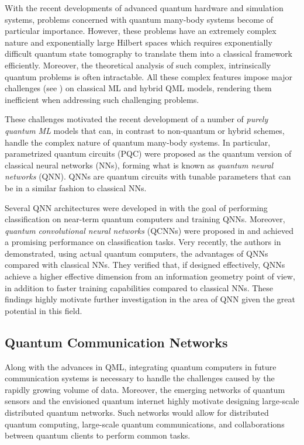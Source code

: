 \documentclass{article}
\begin{document}
With the recent developments of advanced quantum hardware and simulation systems, problems concerned with quantum many-body systems \cite{quantum_many_body_systems} become of particular importance. However, these problems have an extremely complex nature and exponentially large Hilbert spaces which requires exponentially difficult quantum state tomography to translate them into a classical framework efficiently. Moreover, the theoretical analysis of such complex, intrinsically quantum problems is often intractable. All these complex features impose major challenges (see \cite{Cong2019_QCNN}) on classical ML and hybrid QML models, rendering them inefficient when addressing such challenging problems.


These challenges motivated the recent development of a number of \emph{purely quantum ML} models that can, in contrast to non-quantum or hybrid schemes, handle the complex nature of quantum many-body systems. In particular, parametrized quantum circuits (PQC) \cite{PQC_as_ML_models} were proposed as the quantum version of classical neural networks (NNs), forming what is known as \emph{quantum neural networks} (QNN). QNNs are quantum circuits with tunable parameters that can be  in a similar fashion to classical NNs. 



Several QNN architectures were developed in \cite{farhi2018classification_QNN,Beer2020_QNN} with the goal of performing classification on near-term quantum computers and training QNNs. Moreover, \emph{quantum convolutional neural networks} (QCNNs) were proposed in \cite{Cong2019_QCNN} and achieved a promising performance on classification tasks. Very recently, the authors in \cite{abbas2020power} demonstrated, using actual quantum computers, the advantages of QNNs compared with classical NNs. They verified that, if designed effectively, QNNs achieve a higher effective dimension from an information geometry point of view, in addition to faster training capabilities compared to classical NNs. These findings highly motivate further investigation in the area of QNN given the great potential in this field.

\subsection{Quantum Communication Networks}
Along with the advances in QML, integrating quantum computers in future communication systems is necessary to handle the challenges caused by the rapidly growing volume of data. Moreover, the emerging networks of quantum sensors \cite{guo2020distributed_sensing} and the envisioned quantum internet \cite{quantum_internet2,quantum_internet1} highly motivate designing large-scale distributed quantum networks. Such networks would allow for distributed quantum computing, large-scale quantum communications, and collaborations between quantum clients to perform common tasks. 
\end{document}
